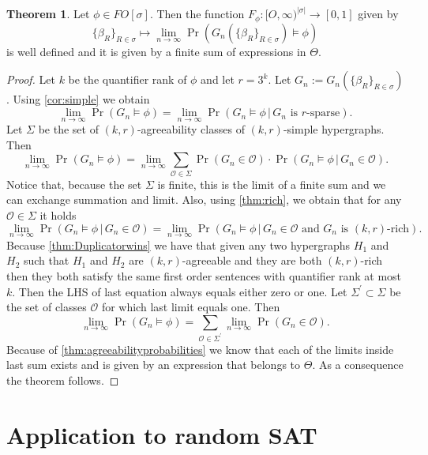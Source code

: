\documentclass[12pt,notitlepage,a4paper]{article}
\theoremstyle{definition}
\newtheorem{theorem}{Theorem}[section]
\newcommand{\Ln}{\lim\limits_{n\to \infty}}
\begin{document}
\begin{theorem}
	Let $\phi\in FO[\sigma]$. Then the function 
	$F_\phi: [O,\infty)^{|\sigma|}\rightarrow [0,1]$
	given by
	\[
	\{\beta_R\}_{R\in \sigma} \mapsto
	\Ln \Pr \left(
	G_n\left(\{\beta_R\}_{R\in \sigma}\right) \models \phi
	\right)
	\]
	is well defined and it is given by a finite sum of expressions
	in $\Theta$.
\end{theorem}
\begin{proof}
	Let $k$ be the quantifier rank of $\phi$ and
	let $r=3^k$. Let 
	$G_n:=G_n\left(\{\beta_R\}_{R\in \sigma}\right)$.
	Using \cref{cor:simple} we obtain
	\[
	\Ln \Pr \left(
	G_n \models \phi
	\right)=
	\Ln \Pr \left(
	G_n\models \phi
	\, \Big|
	\, G_n
	\text{ is $r$-sparse}
	\right).
	\]
	Let $\Sigma$ be the set of $(k,r)$-agreeability classes of 
	$(k,r)$-simple hypergraphs. 
	Then
	\begin{equation} \label{eq:aux1}
	\Ln \Pr \left(
	G_n \models \phi
	\right)=
	\Ln
	\sum_{\mathcal{O}\in \Sigma} \Pr\left(
	G_n\in \mathcal{O}
	\right) \cdot 
	\Pr\left(
	G_n\models \phi \,
	\Big| \,
	G_n\in \mathcal{O}
	\right).
	\end{equation}
	Notice that, because the set $\Sigma$ is finite, 
	this is the limit of a finite sum and we can exchange
	summation and limit. Also, 
	using \cref{thm:rich}, we obtain that for any $\mathcal{O}\in \Sigma$
	it holds
	\[
	\Ln \Pr\left(
	G_n\models \phi \,
	\Big| \,
	G_n\in \mathcal{O}
	\right) = 
		\Ln \Pr\left(
	G_n\models \phi \,
	\Big| \,
	G_n\in \mathcal{O}
 	\text{ and } G_n \text{ 
	is $(k,r)$-rich} 	\right).
	\]
	Because \cref{thm:Duplicatorwins} we have that given any two hypergraphs
	$H_1$ and $H_2$ such that $H_1$ and $H_2$ are $(k,r)$-agreeable and they
	are both $(k,r)$-rich then they both satisfy the same first order sentences
	with quantifier rank at most $k$. Then the LHS of last equation always equals
	either zero or one. Let $\Sigma^\prime\subset \Sigma$ be the set of classes 
	$\mathcal{O}$ for which last limit equals one. Then
	\[
	\Ln \Pr \left(
	G_n \models \phi
	\right)=
	\sum_{\mathcal{O}\in \Sigma^\prime}
	\Ln \Pr\left(
	G_n \in \mathcal{O}
	\right).		
	\]
	Because of \cref{thm:agreeabilityprobabilities} we know that
	each of the limits inside last sum exists and is given by
	an expression that belongs to $\Theta$. As a consequence the
	theorem follows. 	
\end{proof}

\section{Application to random SAT}
\end{document}
